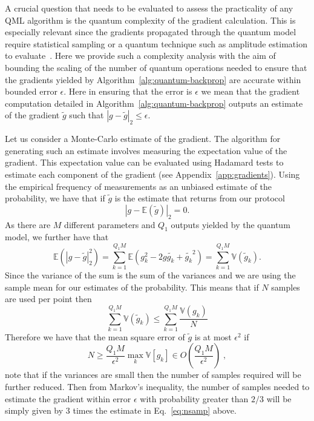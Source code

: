 A crucial question that needs to be evaluated to assess the practicality of any QML algorithm is the quantum complexity of the gradient calculation.  This is especially relevant since the gradients propagated through the quantum model require statistical sampling or a quantum technique such as amplitude estimation to evaluate~\cite{Brassard_2002,Suzuki_2020,Grinko_2021}.  Here we provide such a complexity analysis with the aim of bounding the scaling of the number of quantum operations needed to ensure that the gradients yielded by Algorithm~\ref{alg:quantum-backprop} are accurate within bounded error $\epsilon$.  Here in ensuring that the error is $\epsilon$ we mean that the gradient computation detailed in Algorithm~\ref{alg:quantum-backprop} outputs an estimate of the gradient $\widetilde{g}$ such that $|g-\widetilde{g}|_2 \le \epsilon$.

Let us consider a Monte-Carlo estimate of the gradient.  The algorithm for generating such an estimate involves measuring the expectation value of the gradient.  This expectation value can be evaluated using Hadamard tests to estimate each component of the gradient (see Appendix~\ref{app:gradients}).  Using the empirical frequency of measurements as an unbiased estimate of the probability, we have that if $\widetilde{g}$ is the estimate that returns from our protocol
\begin{equation}
| g - \mathbb{E}(\widetilde{g})|_2 =0. 
\end{equation}
As there are $M$ different parameters and $Q_1$ outputs yielded by the quantum model, we further have that
\begin{equation}
\mathbb{E}(|g - \widetilde{g}|_2^2) = \sum_{k=1}^{Q_1 M} \mathbb{E}(g_k^2 - 2 g\widetilde{g_k} +\widetilde{g_k}^2) =\sum_{k=1}^{Q_1 M} \mathbb{V}(\widetilde{g}_k).
\end{equation}
Since the variance of the sum is the sum of the variances and we are using the sample mean for our estimates of the probability.  This means that if $N$ samples are used per point then
\begin{equation}
\sum_{k=1}^{Q_1 M} \mathbb{V}(\widetilde{g}_k) \le \sum_{k=1}^{Q_1 M} \frac{\mathbb{V}(g_k)}{N} 
\end{equation} 
Therefore we have that the mean square error of $\widetilde{g}$ is at most $\epsilon^2$ if
\begin{equation}
N \geq \frac{Q_1M}{\epsilon^2} \max_{k}\mathbb{V}[g_{k}]\in O\left(\frac{Q_1M}{\epsilon^2}\right)\;,\label{eq:nsamp}
\end{equation}
note that if the variances are small then the number of samples required will be further reduced.
Then from Markov's inequality, the number of samples needed to estimate the gradient within error $\epsilon$ with probability greater than $2/3$ will be simply given by $3$ times the estimate in Eq.~\eqref{eq:nsamp} above. 

